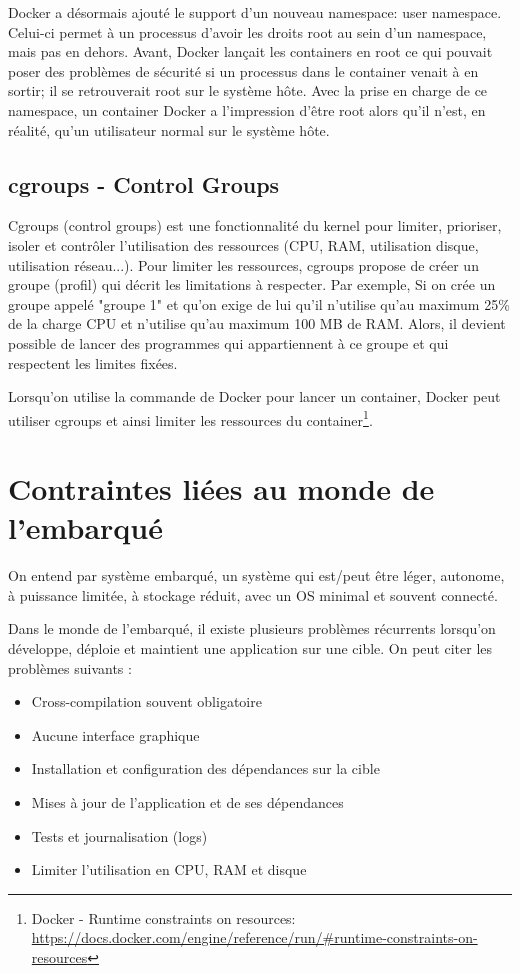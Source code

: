 Docker a désormais ajouté le support d'un nouveau namespace: user namespace. Celui-ci permet à un processus d'avoir les droits root au sein d'un namespace, mais pas en dehors. Avant, Docker lançait les containers en root ce qui pouvait poser des problèmes de sécurité si un processus dans le container venait à en sortir; il se retrouverait root sur le système hôte. Avec la prise en charge de ce namespace, un container Docker a l'impression d'être root alors qu'il n'est, en réalité, qu'un utilisateur normal sur le système hôte.

\subsection{cgroups - Control Groups}
Cgroups (control groups) est une fonctionnalité du kernel pour limiter, prioriser, isoler et contrôler l'utilisation des ressources (CPU, RAM, utilisation disque, utilisation réseau...). Pour limiter les ressources, cgroups propose de créer un groupe (profil) qui décrit les limitations à respecter. Par exemple, Si on crée un groupe appelé "groupe 1" et qu'on exige de lui qu'il n'utilise qu'au maximum 25\% de la charge CPU et n'utilise qu'au maximum 100 MB de RAM. Alors, il devient possible de lancer des programmes qui appartiennent à ce groupe et qui respectent les limites fixées.

Lorsqu'on utilise la commande  de Docker pour lancer un container, Docker peut utiliser cgroups et ainsi limiter les ressources du container\footnote{Docker - Runtime constraints on resources: \url{https://docs.docker.com/engine/reference/run/\#runtime-constraints-on-resources}}.

\section{Contraintes liées au monde de l'embarqué}
On entend par système embarqué, un système qui est/peut être léger, autonome, à puissance limitée, à stockage réduit, avec un OS minimal et souvent connecté.

Dans le monde de l'embarqué, il existe plusieurs problèmes récurrents lorsqu'on développe, déploie et maintient une application sur une cible. On peut citer les problèmes suivants :

\begin{itemize}
\item Cross-compilation souvent obligatoire
\item Aucune interface graphique
\item Installation et configuration des dépendances sur la cible
\item Mises à jour de l'application et de ses dépendances
\item Tests et journalisation (logs)
\item Limiter l'utilisation en CPU, RAM et disque
\end{itemize}


